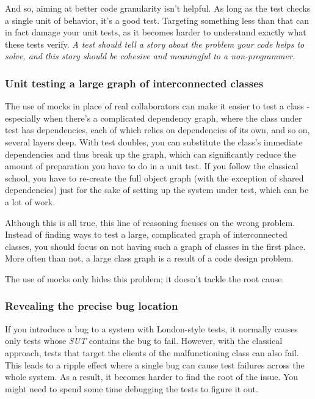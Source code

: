 \documentclass{article}
\begin{document}
And so, aiming at better code granularity isn’t helpful. As long as the test checks a single unit of behavior, it’s a good test. Targeting something less than that can in fact damage your unit tests, as it becomes harder to understand exactly what these tests verify. \textit{A test should tell a story about the problem your code helps to solve, and this story should be cohesive and meaningful to a non-programmer.}

\subsubsection{Unit testing a large graph of interconnected classes}

The use of mocks in place of real collaborators can make it easier to test a class - especially when there’s a complicated dependency graph, where the class under test has dependencies, each of which relies on dependencies of its own, and so on, several layers deep. With test doubles, you can substitute the class’s immediate dependencies and thus break up the graph, which can significantly reduce the amount of preparation you have to do in a unit test. If you follow the classical school, you have to re-create the full object graph (with the exception of shared dependencies) just for the sake of setting up the system under test, which can be a lot of work.

Although this is all true, this line of reasoning focuses on the wrong problem. Instead of finding ways to test a large, complicated graph of interconnected classes, you should focus on not having such a graph of classes in the first place. More often than not, a large class graph is a result of a code design problem.

The use of mocks only hides this problem; it doesn’t tackle the root cause. 

\subsubsection{Revealing the precise bug location}
If you introduce a bug to a system with London-style tests, it normally causes only tests whose \textit{SUT} contains the bug to fail. However, with the classical approach, tests that target the clients of the malfunctioning class can also fail. This leads to a ripple effect where a single bug can cause test failures across the whole system. As a result, it becomes harder to find the root of the issue. You might need to spend some time debugging the tests to figure it out.
\end{document}
